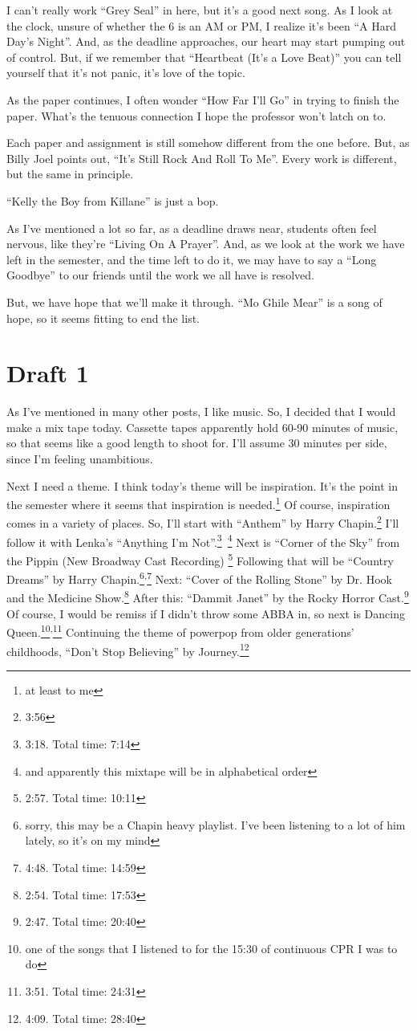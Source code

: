 \documentclass[12pt]{article}[titlepage]
\newcommand{\say}[1]{``#1''}
\newcommand{\1}{\={a}}
\newcommand{\2}{\={e}}
\newcommand{\3}{\={\i}}
\newcommand{\4}{\=o}
\newcommand{\5}{\=u}
\newcommand{\6}{\={A}}
\renewcommand{\,}{\textsuperscript{,}}
\begin{document}
I can't really work \say{Grey Seal} in here, but it's a good next song.
As I look at the clock, unsure of whether the 6 is an AM or PM, I realize it's been \say{A Hard Day's Night}.
And, as the deadline approaches, our heart may start pumping out of control.
But, if we remember that \say{Heartbeat (It's a Love Beat)} you can tell yourself that it's not panic, it's love of the topic.

As the paper continues, I often wonder \say{How Far I'll Go} in trying to finish the paper.
What's the tenuous connection I hope the professor won't latch on to.

Each paper and assignment is still somehow different from the one before.
But, as Billy Joel points out, \say{It's Still Rock And Roll To Me}.
Every work is different, but the same in principle.

\say{Kelly the Boy from Killane} is just a bop.

As I've mentioned a lot so far, as a deadline draws near, students often feel nervous, like they're \say{Living On A Prayer}.
And, as we look at the work we have left in the semester, and the time left to do it, we may have to say a \say{Long Goodbye} to our friends until the work we all have is resolved.

But, we have hope that we'll make it through.
\say{Mo Ghile Mear} is a song of hope, so it seems fitting to end the list.

\section{Draft 1}
As I've mentioned in many other posts, I like music.
So, I decided that I would make a mix tape today.
Cassette tapes apparently hold 60-90 minutes of music, so that seems like a good length to shoot for.
I'll assume 30 minutes per side, since I'm feeling unambitious.

Next I need a theme.
I think today's theme will be inspiration.
It's the point in the semester where it seems that inspiration is needed.\footnote{at least to me}
Of course, inspiration comes in a variety of places.
So, I'll start with \say{Anthem} by Harry Chapin.\footnote{3:56}
I'll follow it with Lenka's \say{Anything I'm Not}.\footnote{3:18. Total time: 7:14}\
\footnote{and apparently this mixtape will be in alphabetical order}
Next is \say{Corner of the Sky} from the Pippin (New Broadway Cast Recording)
\footnote{2:57. Total time: 10:11}
Following that will be \say{Country Dreams} by Harry Chapin.\footnote{sorry, this may be a Chapin heavy playlist. I've been listening to a lot of him lately, so it's on my mind}\,\footnote{4:48. Total time: 14:59}
Next: \say{Cover of the Rolling Stone} by Dr. Hook and the Medicine Show.\footnote{2:54. Total time: 17:53}
After this: \say{Dammit Janet} by the Rocky Horror Cast.\footnote{2:47. Total time: 20:40}
Of course, I would be remiss if I didn't throw some ABBA in, so next is Dancing Queen.\footnote{one of the songs that I listened to for the 15:30 of continuous CPR I was to do}\,\footnote{3:51. Total time: 24:31}
Continuing the theme of powerpop from older generations' childhoods, \say{Don't Stop Believing} by Journey.\footnote{4:09. Total time: 28:40}
\end{document}
